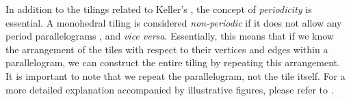 \documentclass[../thesis.tex]{subfiles}
\begin{document}

In addition to the tilings related to Keller's , the concept of \emph{periodicity} is essential. A monohedral tiling is considered \emph{non-periodic} if it does not allow any period parallelograms \cite{penrosePentaplexityClassNonPeriodic1979}, and \emph{vice versa}. Essentially, this means that if we know the arrangement of the tiles with respect to their vertices and edges within a parallelogram, we can construct the entire tiling by repeating this arrangement. It is important to note that we repeat the parallelogram, not the tile itself. For a more detailed explanation accompanied by illustrative figures, please refer to \cite[p.29-30]{grunbaumTilingsPatterns1987}. 
\end{document}

